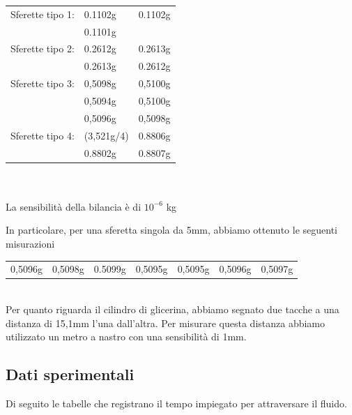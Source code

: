 \documentclass[a4paper,10pt]{report}
\begin{document}
\begin{tabular}{lll}
 Sferette tipo 1:
 & 0.1102g & 0.1102g \\
 & 0.1101g & \\
 \midrule
 Sferette tipo 2: 
 & 0.2612g & 0.2613g \\
 & 0.2613g & 0.2612g \\
 \midrule
 Sferette tipo 3: 
 & 0,5098g & 0,5100g \\
 & 0,5094g & 0,5100g \\
 & 0,5096g & 0,5098g \\
 \midrule
 Sferette tipo 4:
  & (3,521g/4) & 0.8806g \\
  & 0.8802g & 0.8807g \\
\end{tabular}
\\
\\
La sensibilità della bilancia è di $10^{-6}$ kg

In particolare, per una sferetta singola da 5mm, abbiamo ottenuto le seguenti misurazioni\\
\begin{tabular}{ccccccc}
0,5096g & 0,5098g & 0.5099g & 0,5095g & 0,5095g & 0,5096g & 0,5097g
\end{tabular}
\\
Per quanto riguarda il cilindro di glicerina, abbiamo segnato due tacche a una distanza di 15,1mm l'una dall'altra.
Per misurare questa distanza abbiamo utilizzato un metro a nastro con una sensibilità di 1mm.

\subsection{Dati sperimentali}
Di seguito le tabelle che registrano il tempo impiegato per attraversare il fluido.
\end{document}

